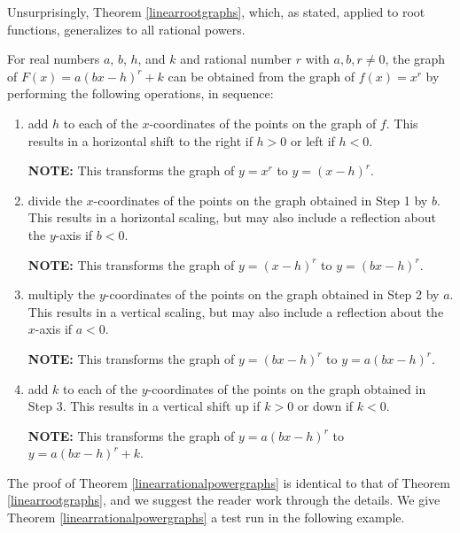 Unsurprisingly, Theorem \ref{linearrootgraphs}, which, as stated, applied to root functions, generalizes to all rational powers.  

\begin{tcolorbox}

\begin{thm} \label{linearrationalpowergraphs}  For real numbers $a$, $b$, $h$, and $k$ and rational number $r$ with $a, b, r \neq 0$, the graph of $F(x) = a(bx-h)^r +k$  can be obtained from the graph of $f(x) = x^r$ by performing the following operations, in sequence:

\begin{enumerate}

\item  add $h$ to each of the $x$-coordinates of the points on the graph of $f$.  This results in a horizontal shift to the right if $h > 0$ or left if $h < 0$.

\textbf{NOTE:}  This transforms the graph of $y =x^{r}$ to $y = (x-h)^{r}$.

\item  divide the $x$-coordinates of the points on the graph obtained in Step 1 by $b$.  This results in a horizontal scaling, but may also include a reflection about the $y$-axis if $b < 0$.

\textbf{NOTE:}  This transforms the graph of $y = (x-h)^{r}$ to $y = (bx-h)^{r}$.

\item  multiply the $y$-coordinates of the points on the graph obtained in Step 2 by $a$.   This results in a vertical scaling, but may also include a reflection about the $x$-axis if $a < 0$.

\textbf{NOTE:}  This transforms the graph of $y = (bx-h)^{r}$ to $y = a(bx-h)^{r}$.

\item  add $k$ to each of the $y$-coordinates of the points on the graph obtained in Step 3.  This results in a vertical shift up if $k > 0$ or down if $k< 0$.

\textbf{NOTE:}  This transforms the graph of $y = a(bx-h)^{r}$ to $y = a(bx-h)^{r}+k$.

\end{enumerate}

\end{thm}

\end{tcolorbox}

The proof of Theorem \ref{linearrationalpowergraphs} is identical to that of Theorem \ref{linearrootgraphs}, and we suggest the reader work through the details.  We give Theorem \ref{linearrationalpowergraphs}  a test run in the following example.

